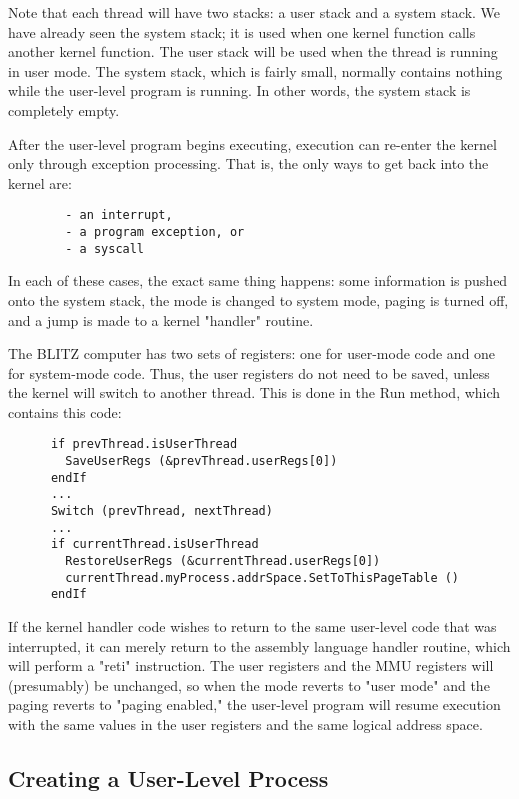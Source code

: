 \documentclass[12pt]{article}
\begin{document}
Note that each thread will have two stacks: a user stack and a system
stack.  We have already seen the system stack; it is used when one
kernel function calls another kernel function.  The user stack will be
used when the thread is running in user mode.  The system stack, which
is fairly small, normally contains nothing while the user-level
program is running.  In other words, the system stack is completely
empty.

After the user-level program begins executing, execution can re-enter
the kernel only through exception processing.  That is, the only
ways to get back into the kernel are:

\begin{verbatim}
        - an interrupt,
        - a program exception, or        
        - a syscall
\end{verbatim}

In each of these cases, the exact same thing happens: some information
is pushed onto the system stack, the mode is changed to system mode,
paging is turned off, and a jump is made to a kernel "handler"
routine.

The BLITZ computer has two sets of registers: one for user-mode code
and one for system-mode code.  Thus, the user registers do not need to
be saved, unless the kernel will switch to another thread.  This is
done in the Run method, which contains this code:

\begin{verbatim}
      if prevThread.isUserThread
        SaveUserRegs (&prevThread.userRegs[0])
      endIf
      ...
      Switch (prevThread, nextThread)
      ...
      if currentThread.isUserThread
        RestoreUserRegs (&currentThread.userRegs[0])
        currentThread.myProcess.addrSpace.SetToThisPageTable ()
      endIf
\end{verbatim}

If the kernel handler code wishes to return to the same user-level
code that was interrupted, it can merely return to the assembly
language handler routine, which will perform a "reti" instruction.
The user registers and the MMU registers will (presumably) be
unchanged, so when the mode reverts to "user mode" and the paging
reverts to "paging enabled," the user-level program will resume
execution with the same values in the user registers and the same
logical address space.

\subsection{Creating a User-Level Process}
\end{document}
